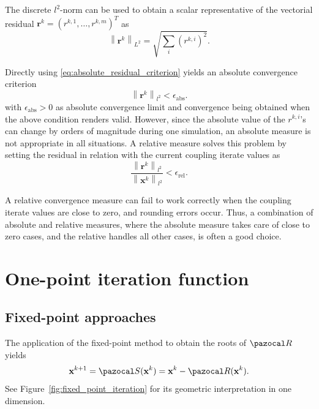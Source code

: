 The discrete  $l^{2}$-norm can be used to obtain a scalar representative of the vectorial residual \(\mathbf r^{k}=\left(r^{k,1}, \ldots, r^{k,m}\right)^{T}\) as
\begin{equation} \label{eq:absolute_residual_criterion}
\left\|\mathbf{r}^{k}\right\|_{L^{2}}=\sqrt{\sum_{i}\left(r^{k, i}\right)^{2}}.
\end{equation}

Directly using \eqref{eq:absolute_residual_criterion} yields an absolute convergence criterion
\begin{equation}
\left\|\boldsymbol{r} ^{k}\right\|_{l^{2}}<\epsilon_\mathrm{abs}.
\end{equation}
with $\epsilon_\mathrm{abs}>0$ as absolute convergence limit and convergence being obtained when the above condition renders valid.
However, since the absolute value of the $r^{k, i} $'s can change by orders of magnitude during one simulation, an absolute measure is not appropriate in all situations.
A relative measure solves this problem by setting the residual in relation with the current coupling iterate values as
\begin{equation}
\frac{\left\|\mathbf{r}^{k}\right\|_{l^{2}}}{\left\|\mathbf{x}^{k}\right\|_{l^{2}}}<\epsilon_\mathrm{rel}.
\end{equation}

A relative convergence measure can fail to work correctly when the coupling iterate values are close to zero, and rounding errors occur.
Thus, a combination of absolute and relative measures, where the absolute measure takes care of close to zero cases, and the relative handles all other cases, is often a good choice.



\section{One-point iteration function}

\subsection{Fixed-point approaches} \label{sec:fixed_point_approach}

The application of the fixed-point method to obtain the roots of \(\pazocal R\) yields
\begin{equation}
  \mathbf x^{k+1} = \pazocal S(\mathbf x^k) = \mathbf x^k - \pazocal R(\mathbf x^k).
\end{equation}
See Figure~\ref{fig:fixed_point_iteration} for its geometric interpretation in one dimension.

